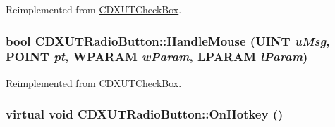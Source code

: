 Reimplemented from \hyperlink{class_c_d_x_u_t_check_box_a6e37b9b6be8e2c13df2927c1cf3d63ef}{CDXUTCheckBox}.\hypertarget{class_c_d_x_u_t_radio_button_aab0a615727913f7f6c8e8d35cc2220e6}{
\subsubsection[{HandleMouse}]{\setlength{\rightskip}{0pt plus 5cm}bool CDXUTRadioButton::HandleMouse (UINT {\em uMsg}, \/  POINT {\em pt}, \/  WPARAM {\em wParam}, \/  LPARAM {\em lParam})}}
\label{class_c_d_x_u_t_radio_button_aab0a615727913f7f6c8e8d35cc2220e6}


Reimplemented from \hyperlink{class_c_d_x_u_t_check_box_a4638ad4bb74d1a5fae3ba2b8b01072d6}{CDXUTCheckBox}.\hypertarget{class_c_d_x_u_t_radio_button_a2950447936727f33130fa4f6928045ac}{
\subsubsection[{OnHotkey}]{\setlength{\rightskip}{0pt plus 5cm}virtual void CDXUTRadioButton::OnHotkey ()}}
\label{class_c_d_x_u_t_radio_button_a2950447936727f33130fa4f6928045ac}


